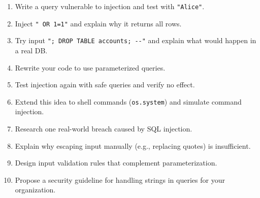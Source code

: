 \documentclass[
  letterpaper,
  DIV=11,
  numbers=noendperiod]{scrreprt}
\providecommand{\tightlist}{%
  \setlength{\itemsep}{0pt}\setlength{\parskip}{0pt}}
\begin{document}
\begin{enumerate}
\def\labelenumi{\arabic{enumi}.}
\tightlist
\item
  Write a query vulnerable to injection and test with \texttt{"Alice"}.
\item
  Inject
  \texttt{"\textquotesingle{}\ OR\ \textquotesingle{}1\textquotesingle{}=\textquotesingle{}1"}
  and explain why it returns all rows.
\item
  Try input \texttt{";\ DROP\ TABLE\ accounts;\ -\/-"} and explain what
  would happen in a real DB.
\item
  Rewrite your code to use parameterized queries.
\item
  Test injection again with safe queries and verify no effect.
\item
  Extend this idea to shell commands (\texttt{os.system}) and simulate
  command injection.
\item
  Research one real-world breach caused by SQL injection.
\item
  Explain why escaping input manually (e.g., replacing quotes) is
  insufficient.
\item
  Design input validation rules that complement parameterization.
\item
  Propose a security guideline for handling strings in queries for your
  organization.
\end{enumerate}
\end{document}
